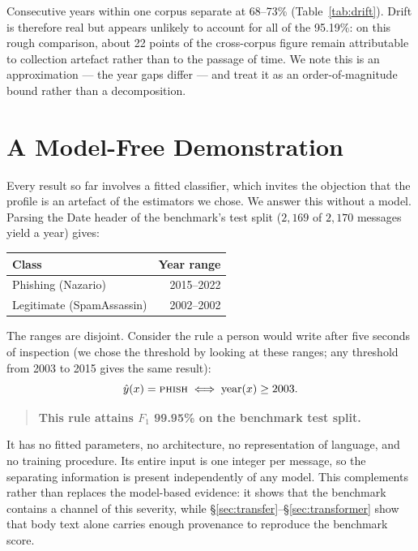 \documentclass[twoside,11pt]{article}
\begin{document}
Consecutive years within one corpus separate at 68--73\%
(Table~\ref{tab:drift}). Drift is therefore real but appears unlikely to
account for all of the 95.19\%: on this rough comparison, about 22 points of
the cross-corpus figure remain attributable to collection artefact rather than
to the passage of time. We
note this is an approximation --- the year gaps differ --- and treat it as an
order-of-magnitude bound rather than a decomposition.

\section{A Model-Free Demonstration}
\label{sec:modelfree}

Every result so far involves a fitted classifier, which invites the objection
that the profile is an artefact of the estimators we chose. We answer this
without a model. Parsing the Date header of the benchmark's
test split ($2{,}169$ of $2{,}170$ messages yield a year) gives:

\begin{center}\small
\begin{tabular}{lr}
\toprule
Class & Year range \\
\midrule
Phishing (Nazario)          & 2015--2022 \\
Legitimate (SpamAssassin)   & 2002--2002 \\
\bottomrule
\end{tabular}
\end{center}

\noindent The ranges are disjoint. Consider the rule a person would write
after five seconds of inspection (we chose the threshold by looking at these
ranges; any threshold from 2003 to 2015 gives the same result):
\[
\hat{y}(x) = \textsc{phish} \iff \mathrm{year}(x) \geq 2003.
\]

\begin{quote}
\textbf{This rule attains $F_1$ 99.95\% on the benchmark test split.}
\end{quote}

It has no fitted parameters, no architecture, no representation of language,
and no training procedure. Its entire input is one integer per message, so
the separating information is present independently of any model. This
complements rather than replaces the model-based evidence: it shows that the
benchmark contains a channel of this severity, while
\S\ref{sec:transfer}--\S\ref{sec:transformer} show that body text alone
carries enough provenance to reproduce the benchmark score.
\end{document}
